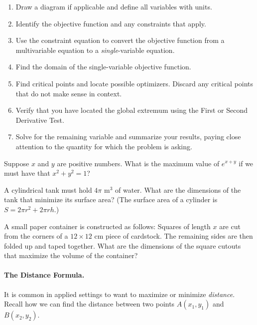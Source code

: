 \documentclass[12pt]{article}
\begin{document}
\begin{enumerate}
\item[\tc{1}] Draw a diagram if applicable and define all variables with units.
\item[\tc{2}] Identify the objective function and any constraints that apply.
\item[\tc{3}] Use the constraint equation to convert the objective function from a multivariable equation to a \textit{single}-variable equation.
\item[\tc{4}] Find the domain of the single-variable objective function.
\item[\tc{5}] Find critical points and locate possible optimizers. Discard any critical points that do not make sense in context.
\item[\tc{6}] Verify that you have located the global extremum using the First or Second Derivative Test.
\item[\tc{7}] Solve for the remaining variable and summarize your results, paying close attention to the quantity for which the problem is asking.
\end{enumerate}

\vspace{3mm}

\Example Suppose $x$ and $y$ are positive numbers. What is the maximum value of $e^{x+y}$ if we must have that $x^2+y^2=1$?

\newpage

\Example A cylindrical tank must hold $4\pi$ m$^3$ of water. What are the dimensions of the tank that minimize its surface area? (The surface area of a cylinder is $S=2\pi r^2+2\pi rh$.)

\newpage

\Example A small paper container is constructed as follows: Squares of length $x$ are cut from the corners of a $12\times 12$ cm piece of cardstock. The remaining sides are then folded up and taped together. What are the dimensions of the square cutouts that maximize the volume of the container?

\newpage

\paragraph{The Distance Formula.} It is common in applied settings to want to maximize or minimize \textit{distance}. Recall how we can find the distance between two points $A(x_1,y_1)$ and $B(x_2,y_2)$.

\vspace{70mm}
\end{document}
